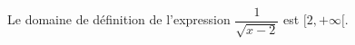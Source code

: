 Le domaine de définition de l'expression $\dfrac{1}{\sqrt{x-2}}$ est $[2,+\infty[$.

\begin{reponses}
\end{reponses}

